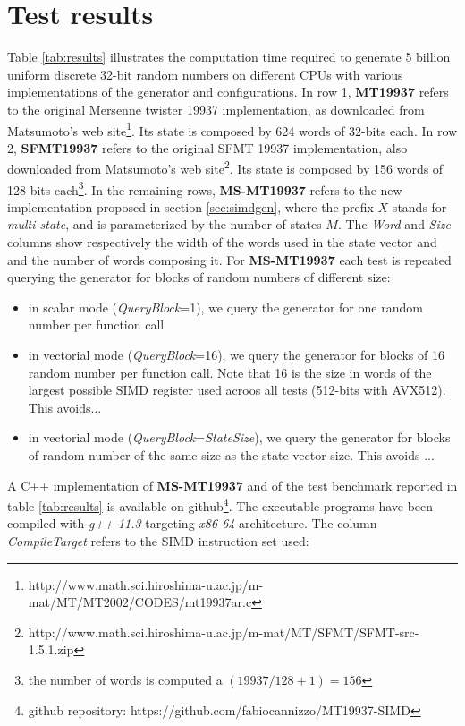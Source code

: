 \documentclass[preprint,1p,times]{elsarticle}
\begin{document}
\section{Test results}
\label{sec:tests}
Table \ref{tab:results} illustrates the computation time required to generate 5 billion uniform discrete 32-bit random numbers on different CPUs with various implementations of the generator and configurations.
In row 1, \textbf{MT19937} refers to the original Mersenne twister 19937 implementation, as downloaded from Matsumoto's web site\footnote{\label{fn:orig}http://www.math.sci.hiroshima-u.ac.jp/m-mat/MT/MT2002/CODES/mt19937ar.c}. Its state is composed by 624 words of 32-bits each.
In row 2, \textbf{SFMT19937} refers to the original SFMT 19937 implementation, also downloaded from Matsumoto's web site\footnote{http://www.math.sci.hiroshima-u.ac.jp/m-mat/MT/SFMT/SFMT-src-1.5.1.zip}. Its state is composed by 156 words of 128-bits each\footnote{the number of words is computed a $(19937 / 128 + 1)=156$}.
In the remaining rows, \textbf{MS-MT19937} refers to the new implementation proposed in section \ref{sec:simdgen}, where the prefix $X$ stands for \textit{multi-state}, and is parameterized by the number of states $M$.
The \textit{Word} and \textit{Size} columns show respectively the width of the words used in the state vector and and the number of words composing it.
For \textbf{MS-MT19937} each test is repeated querying the generator for blocks of random numbers of different size:
\begin{itemize}
    \item in scalar mode (\textit{QueryBlock}=1), we query the generator for one random number per function call
    \item in vectorial mode (\textit{QueryBlock}=16), we query the generator for blocks of 16 random number per function call. Note that 16 is the size in words of the largest possible SIMD register used acroos all tests (512-bits with AVX512). This avoids...
    \item in vectorial mode (\textit{QueryBlock}=\textit{StateSize}), we query the generator for blocks of random number of the same size as the state vector size. This avoids ...
\end{itemize}
A C++ implementation of \textbf{MS-MT19937} and of the test benchmark reported in table \ref{tab:results} is available on github\footnote{github repository: https://github.com/fabiocannizzo/MT19937-SIMD}. The executable programs have been compiled with \textit{g++ 11.3} targeting \textit{x86-64} architecture. The column \textit{CompileTarget} refers to the SIMD instruction set used:
\end{document}
